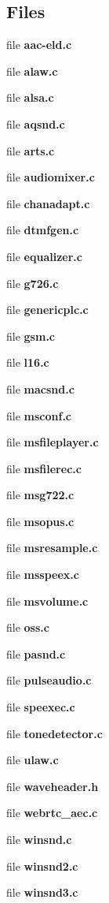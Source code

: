 \subsection*{Files}
\begin{DoxyCompactItemize}
\item 
file {\bfseries aac-\/eld.c}
\item 
file {\bfseries alaw.c}
\item 
file {\bfseries alsa.c}
\item 
file {\bfseries aqsnd.c}
\item 
file {\bfseries arts.c}
\item 
file {\bfseries audiomixer.c}
\item 
file {\bfseries chanadapt.c}
\item 
file {\bfseries dtmfgen.c}
\item 
file {\bfseries equalizer.c}
\item 
file {\bfseries g726.c}
\item 
file {\bfseries genericplc.c}
\item 
file {\bfseries gsm.c}
\item 
file {\bfseries l16.c}
\item 
file {\bfseries macsnd.c}
\item 
file {\bfseries msconf.c}
\item 
file {\bfseries msfileplayer.c}
\item 
file {\bfseries msfilerec.c}
\item 
file {\bfseries msg722.c}
\item 
file {\bfseries msopus.c}
\item 
file {\bfseries msresample.c}
\item 
file {\bfseries msspeex.c}
\item 
file {\bfseries msvolume.c}
\item 
file {\bfseries oss.c}
\item 
file {\bfseries pasnd.c}
\item 
file {\bfseries pulseaudio.c}
\item 
file {\bfseries speexec.c}
\item 
file {\bfseries tonedetector.c}
\item 
file {\bfseries ulaw.c}
\item 
file {\bfseries waveheader.h}
\item 
file {\bfseries webrtc\_\-aec.c}
\item 
file {\bfseries winsnd.c}
\item 
file {\bfseries winsnd2.c}
\item 
file {\bfseries winsnd3.c}
\end{DoxyCompactItemize}
